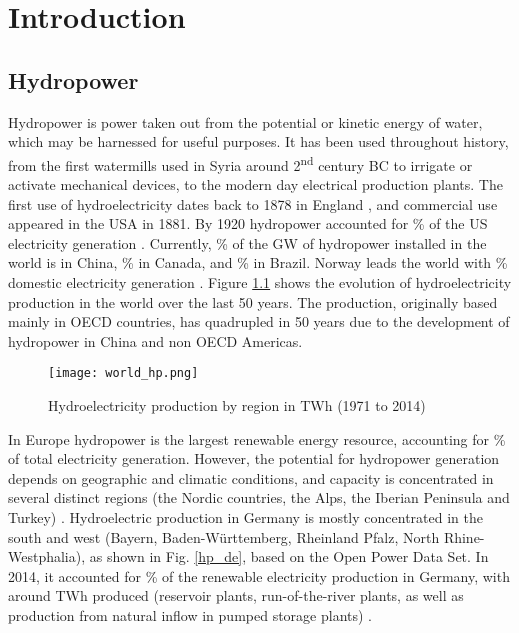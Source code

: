 \chapter{Introduction}
\label{chap:introduction}


\section{Hydropower}

Hydropower is power taken out from the potential or kinetic energy of water, which may be harnessed for useful purposes. It has been used throughout history, from the first watermills used in Syria around 2\textsuperscript{nd} century BC \cite{reynolds} to irrigate or activate mechanical devices, to the modern day electrical production plants. The first use of hydroelectricity dates back to 1878 in England \cite{indus_arch}, and commercial use appeared in the USA in 1881. By 1920 hydropower accounted for \unit[25]{\%} of the US electricity generation \cite{hist_hyd}. \newline
Currently,  \unit[27]{\%}  of the \unit[1171]{GW} of hydropower installed in the world is  in China, \unit[10]{\%} in Canada, and \unit[9]{\%} in Brazil. Norway leads the world with \unit[96]{\%} domestic electricity generation \cite{iea_stat}. Figure \ref{world_hp} shows the evolution of hydroelectricity production in the world over the last 50 years. The production, originally based mainly in OECD countries, has quadrupled in 50 years due to the development of hydropower in China and non OECD Americas.

\begin{figure}[H]
\centering
\texttt{[image: world\_hp.png]}
\caption[Hydroelectricity production by region in TWh (1971 to 2014)]{Hydroelectricity production by region in TWh (1971 to 2014) \cite{iea_stat}}
\label{world_hp}
\end{figure}

In Europe hydropower is the largest renewable energy resource, accounting for \unit[18]{\%} of total electricity generation. However, the potential for hydropower generation depends on geographic and climatic conditions, and capacity is concentrated in several distinct regions (the Nordic countries, the Alps, the Iberian Peninsula and Turkey) \cite{hp_europe}. \newline
Hydroelectric production in Germany is mostly concentrated in the south and west (Bayern, Baden-Württemberg, Rheinland Pfalz, North Rhine-Westphalia), as shown in Fig. \ref{hp_de}, based on the Open Power Data Set. In 2014, it accounted for \unit[12]{\%} of the renewable electricity production in Germany, with around \unit[20]{TWh} produced (reservoir plants, run-of-the-river plants, as well as production from natural inflow in pumped storage plants) \cite{bdew}.

